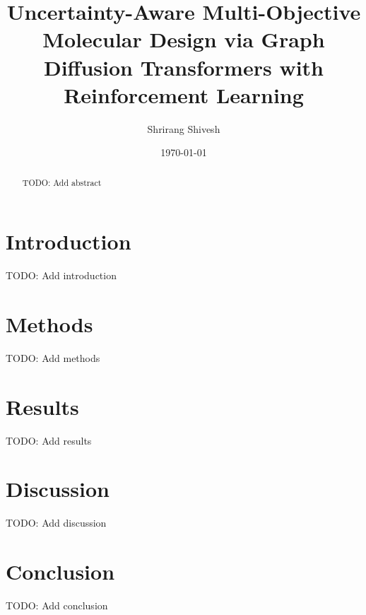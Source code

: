 \documentclass[11pt,a4paper]{article}
\title{Uncertainty-Aware Multi-Objective Molecular Design via Graph Diffusion Transformers with Reinforcement Learning}
\author{Shrirang Shivesh}
\date{\today}
\begin{document}
\maketitle

\begin{abstract}
TODO: Add abstract
\end{abstract}

\section{Introduction}
TODO: Add introduction

\section{Methods}
TODO: Add methods

\section{Results}
TODO: Add results

\section{Discussion}
TODO: Add discussion

\section{Conclusion}
TODO: Add conclusion



\end{document}
